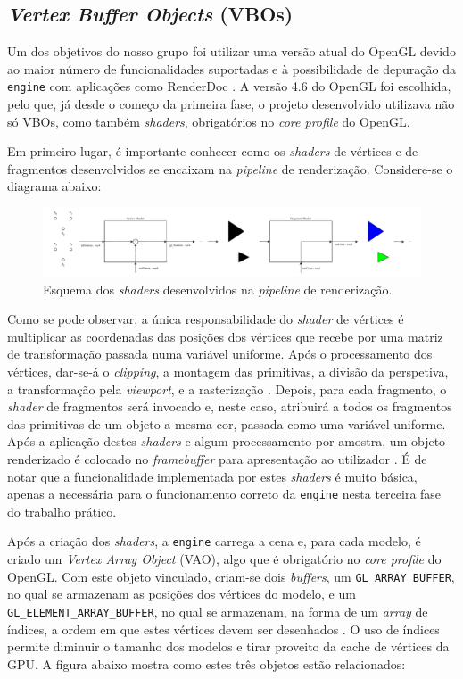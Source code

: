 \documentclass[12pt, a4paper]{article}
\begin{document}
\subsection{\emph{Vertex Buffer Objects} (VBOs)}

Um dos objetivos do nosso grupo foi utilizar uma versão atual do OpenGL devido ao maior número de
funcionalidades suportadas e à possibilidade de depuração da \texttt{engine} com aplicações como
RenderDoc \cite{renderdoc}. A versão 4.6 do OpenGL foi escolhida, pelo que, já desde o começo da
primeira fase, o projeto desenvolvido utilizava não só VBOs, como também \emph{shaders},
obrigatórios no \emph{core profile} do OpenGL.

Em primeiro lugar, é importante conhecer como os \emph{shaders} de vértices e de fragmentos
desenvolvidos se encaixam na \emph{pipeline} de renderização. Considere-se o diagrama abaixo:

\begin{figure}[H]
    \centering
    \includegraphics[width=\textwidth]{res/phase3/Shaders.pdf}
    \caption{Esquema dos \emph{shaders} desenvolvidos na \emph{pipeline} de renderização.}
\end{figure}

Como se pode observar, a única responsabilidade do \emph{shader} de vértices é multiplicar as
coordenadas das posições dos vértices que recebe por uma matriz de transformação passada numa
variável uniforme. Após o processamento dos vértices, dar-se-á o \emph{clipping}, a montagem das
primitivas, a divisão da perspetiva, a transformação pela \emph{viewport}, e a rasterização
\cite{vertex-post-processing}. Depois, para cada fragmento, o \emph{shader} de fragmentos será
invocado e, neste caso, atribuirá a todos os fragmentos das primitivas de um objeto a mesma cor,
passada como uma variável uniforme. Após a aplicação destes \emph{shaders} e algum processamento por
amostra, um objeto renderizado é colocado no \emph{framebuffer} para apresentação ao utilizador
\cite{per-sample-processing}. É de notar que a funcionalidade implementada por estes \emph{shaders}
é muito básica, apenas a necessária para o funcionamento correto da \texttt{engine} nesta terceira
fase do trabalho prático.

Após a criação dos \emph{shaders}, a \texttt{engine} carrega a cena e, para cada modelo, é criado um
\emph{Vertex Array Object} (VAO), algo que é obrigatório no \emph{core profile} do OpenGL. Com este
objeto vinculado, criam-se dois \emph{buffers}, um \texttt{GL\_ARRAY\_BUFFER}, no qual se armazenam
as posições dos vértices do modelo, e um \texttt{GL\_ELEMENT\_ARRAY\_BUFFER}, no qual se armazenam,
na forma de um \emph{array} de índices, a ordem em que estes vértices devem ser desenhados
\cite{glBufferData}. O uso de índices permite diminuir o tamanho dos modelos e tirar proveito da
cache de vértices da GPU. A figura abaixo mostra como estes três objetos estão relacionados:
\end{document}
